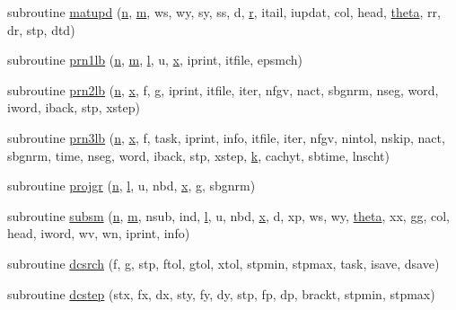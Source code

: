 \begin{DoxyCompactItemize}
\item 
subroutine \hyperlink{lbfgsb_8f_ae0d8b7b11bf7546ed4d53b433273f74b}{matupd} (\hyperlink{indexexpr_8h_ab427e2e2b4d6cec55fa088ea2a692ace}{n}, \hyperlink{indexexpr_8h_ab72fdb4031d47b75ab26dd18a437bcdc}{m}, ws, wy, sy, ss, d, \hyperlink{indexexpr_8h_ac434fd11cc2493608d8d91424d60c17e}{r}, itail, iupdat, col, head, \hyperlink{gen__mat5files_8m_a485aacac5dba13c16bc07a75e7af465c}{theta}, rr, dr, stp, dtd)
\item 
subroutine \hyperlink{lbfgsb_8f_a9d5d96d3efd3ea19322ee8d472954cc9}{prn1lb} (\hyperlink{indexexpr_8h_ab427e2e2b4d6cec55fa088ea2a692ace}{n}, \hyperlink{indexexpr_8h_ab72fdb4031d47b75ab26dd18a437bcdc}{m}, \hyperlink{indexexpr_8h_a88aacdaa46b76729743ee33ef8b95a58}{l}, u, \hyperlink{vecnorm1_8cc_ac73eed9e41ec09d58f112f06c2d6cb63}{x}, iprint, itfile, epsmch)
\item 
subroutine \hyperlink{lbfgsb_8f_a5df5a6f8f26c5a5a68585b45a41032bd}{prn2lb} (\hyperlink{indexexpr_8h_ab427e2e2b4d6cec55fa088ea2a692ace}{n}, \hyperlink{vecnorm1_8cc_ac73eed9e41ec09d58f112f06c2d6cb63}{x}, f, g, iprint, itfile, iter, nfgv, nact, sbgnrm, nseg, word, iword, iback, stp, xstep)
\item 
subroutine \hyperlink{lbfgsb_8f_a433c19f6cb8b79a552a65371fecffb8c}{prn3lb} (\hyperlink{indexexpr_8h_ab427e2e2b4d6cec55fa088ea2a692ace}{n}, \hyperlink{vecnorm1_8cc_ac73eed9e41ec09d58f112f06c2d6cb63}{x}, f, task, iprint, info, itfile, iter, nfgv, nintol, nskip, nact, sbgnrm, time, nseg, word, iback, stp, xstep, \hyperlink{indexexpr_8h_abb72938a198351550846b37a84588b63}{k}, cachyt, sbtime, lnscht)
\item 
subroutine \hyperlink{lbfgsb_8f_a7c7b868c8b42f51efd25e48cd293cb5f}{projgr} (\hyperlink{indexexpr_8h_ab427e2e2b4d6cec55fa088ea2a692ace}{n}, \hyperlink{indexexpr_8h_a88aacdaa46b76729743ee33ef8b95a58}{l}, u, nbd, \hyperlink{vecnorm1_8cc_ac73eed9e41ec09d58f112f06c2d6cb63}{x}, g, sbgnrm)
\item 
subroutine \hyperlink{lbfgsb_8f_a885224f17c93707dec22de0a51a4081d}{subsm} (\hyperlink{indexexpr_8h_ab427e2e2b4d6cec55fa088ea2a692ace}{n}, \hyperlink{indexexpr_8h_ab72fdb4031d47b75ab26dd18a437bcdc}{m}, nsub, ind, \hyperlink{indexexpr_8h_a88aacdaa46b76729743ee33ef8b95a58}{l}, u, nbd, \hyperlink{vecnorm1_8cc_ac73eed9e41ec09d58f112f06c2d6cb63}{x}, d, xp, ws, wy, \hyperlink{gen__mat5files_8m_a485aacac5dba13c16bc07a75e7af465c}{theta}, xx, gg, col, head, iword, wv, wn, iprint, info)
\item 
subroutine \hyperlink{lbfgsb_8f_a25db7a7d8ddac831be23892a10ba2a76}{dcsrch} (f, g, stp, ftol, gtol, xtol, stpmin, stpmax, task, isave, dsave)
\item 
subroutine \hyperlink{lbfgsb_8f_aa8518f45aef3723242c7ca3f41717a31}{dcstep} (stx, fx, dx, sty, fy, dy, stp, fp, dp, brackt, stpmin, stpmax)
\end{DoxyCompactItemize}


